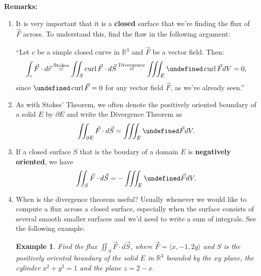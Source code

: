 \documentclass[12pt]{article}
\newcommand{\p}{\partial}
\newcommand{\R}{ \mathbb{R}}
\newcommand{\vr}{\vec{r}{}}
\newcommand{\vF}{\vec{F}}
\renewcommand{\lg}{\langle}
\newcommand{\rg}{\rangle}
\newcommand{\Fline}{\vF\cdot d\vr}
\DeclareMathOperator{\curl}{curl}
\newcommand{\Fsur}{\vF\cdot d\vS}
\newcommand{\vS}{\vec{S}}
\newcommand{\flux}{\iint_S \vF\cdot d\vS}
\let \div \undefined
\DeclareMathOperator{\div}{div}
\newtheorem{example}{Example}
\begin{document}
\textbf{Remarks:}
\begin{enumerate}
\item It is very important that it is a \textbf{closed} surface that we're finding the flux of $\vF$ across. To understand this, find the flaw in the following argument:

``Let $c$ be a simple closed curve in $\R^3$ and $\vF$ be a vector field. Then:
$$\int_c \Fline \overset{\mathrm{Stokes}}{=}\iint_S \curl \vF\cdot d\vS\overset{\mathrm{Divergence}}{=}\iiint_E \div\curl\vF dV=0,$$ since $\div\curl\vF=0$ for any vector field $\vF$, as we've already seen.''

\item As with Stokes' Theorem, we often denote the positively oriented boundary of a solid $E$ by $\p E$ and write the Divergence Theorem as $$\iint_{\p E}\Fsur=\iiint_E \div \vF dV.$$

\item If a closed surface $S$ that is the boudary of a domain $E$ is \textbf{negatively oriented}, we have $$\iint_S\Fsur=-\iiint_E \div \vF dV.$$

\item When is the divergence theorem useful? Usually whenever we would like to compute a flux across a closed surface, especially when the surface consists of several smooth smaller surfaces and we'd need to write a sum of integrals. See the following example:

\begin{example}
Find the flux $\flux$, where $\vF=\lg x,-1,2y\rg $ and $S$ is the positively oriented boundary of the solid $E$ in $\R^3$ bounded by the $xy$ plane, the cylinder $x^2+y^2=1$ and the plane $z=2-x$.
\end{example}


\end{enumerate}
\end{document}
